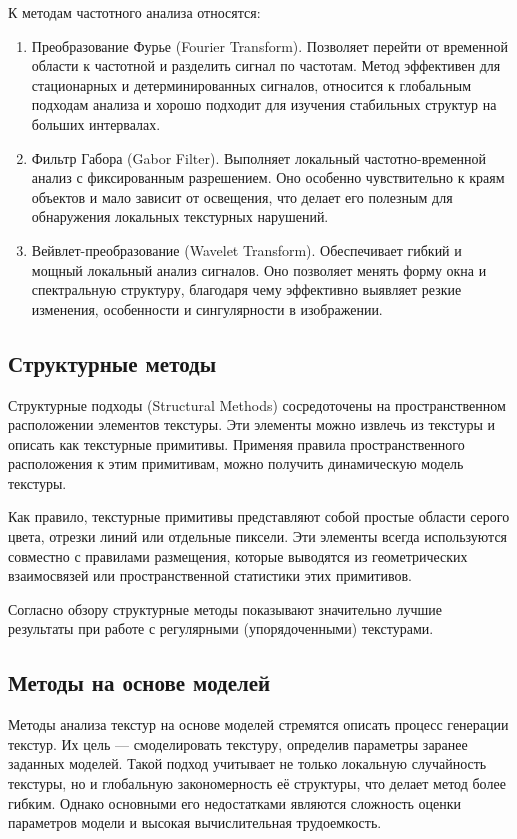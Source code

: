 \documentclass[14pt,a4paper]{article}
\begin{document}
К методам частотного анализа относятся:
\begin{enumerate}
	\item Преобразование Фурье (Fourier Transform). Позволяет перейти от временной области к частотной и разделить сигнал по частотам. Метод эффективен для стационарных и детерминированных сигналов, относится к глобальным подходам анализа и хорошо подходит для изучения стабильных структур на больших интервалах.
	\item Фильтр Габора (Gabor Filter). Выполняет локальный частотно-временной анализ с фиксированным разрешением. Оно особенно чувствительно к краям объектов и мало зависит от освещения, что делает его полезным для обнаружения локальных текстурных нарушений.
	\item Вейвлет-преобразование (Wavelet Transform). Обеспечивает гибкий и мощный локальный анализ сигналов. Оно позволяет менять форму окна и спектральную структуру, благодаря чему эффективно выявляет резкие изменения, особенности и сингулярности в изображении.
\end{enumerate}

\subsection{Структурные методы}
Структурные подходы (Structural Methods) сосредоточены на пространственном расположении элементов текстуры. Эти элементы можно извлечь из текстуры и описать как текстурные примитивы. Применяя правила пространственного расположения к этим примитивам, можно получить динамическую модель текстуры.

Как правило, текстурные примитивы представляют собой простые области серого цвета, отрезки линий или отдельные пиксели. Эти элементы всегда используются совместно с правилами размещения, которые выводятся из геометрических взаимосвязей или пространственной статистики этих примитивов.

Согласно обзору \cite{Czimmermann2020} структурные методы показывают значительно лучшие результаты при работе с регулярными (упорядоченными) текстурами.

\subsection{Методы на основе моделей}
Методы анализа текстур на основе моделей стремятся описать процесс генерации текстур. Их цель — смоделировать текстуру, определив параметры заранее заданных моделей. Такой подход учитывает не только локальную случайность текстуры, но и глобальную закономерность её структуры, что делает метод более гибким. Однако основными его недостатками являются сложность оценки параметров модели и высокая вычислительная трудоемкость.
\end{document}

